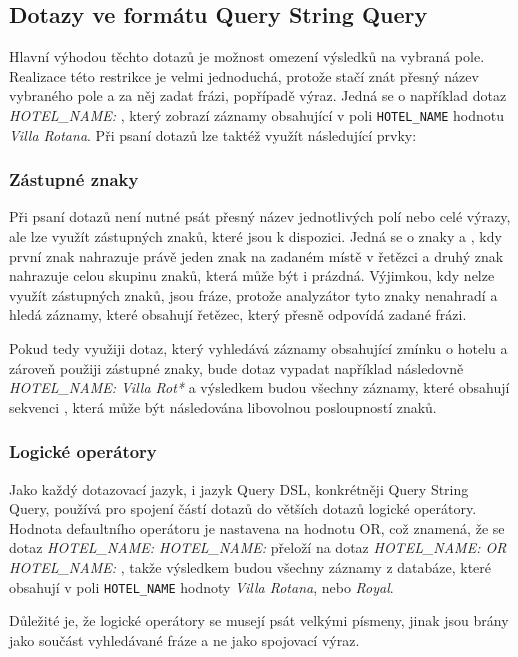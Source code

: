\documentclass[czech,BP]{thesiskiv}
\begin{document}
\subsection{Dotazy ve formátu Query String Query}
Hlavní výhodou těchto dotazů je možnost omezení výsledků na vybraná pole. Realizace této restrikce je velmi jednoduchá, protože stačí znát přesný název vybraného pole a za něj zadat frázi, popřípadě výraz. Jedná se o například dotaz \textit{HOTEL\_NAME: }, který zobrazí záznamy obsahující v poli \texttt{HOTEL\_NAME} hodnotu \textit{Villa Rotana}. Při psaní dotazů lze taktéž využít následující prvky:

\subsubsection{Zástupné znaky}
Při psaní dotazů není nutné psát přesný název jednotlivých polí nebo celé výrazy, ale lze využít zástupných znaků, které jsou k dispozici. Jedná se o znaky  a \uv{*}, kdy první znak nahrazuje právě jeden znak na zadaném místě v řetězci a druhý znak nahrazuje celou skupinu znaků, která může být i prázdná. Výjimkou, kdy nelze využít zástupných znaků, jsou fráze, protože analyzátor tyto znaky nenahradí a hledá záznamy, které obsahují řetězec, který přesně odpovídá zadané frázi.


Pokud tedy využiji dotaz, který vyhledává záznamy obsahující zmínku o hotelu  a zároveň použiji zástupné znaky, bude dotaz vypadat například následovně \textit{HOTEL\_NAME: Villa Rot*} a výsledkem budou všechny záznamy, které obsahují sekvenci , která může být následována libovolnou posloupností znaků.

\subsubsection{Logické operátory}
Jako každý dotazovací jazyk, i jazyk Query DSL, konkrétněji Query String Query, používá pro spojení částí dotazů do větších dotazů logické operátory. Hodnota defaultního operátoru je nastavena na hodnotu OR, což znamená, že se dotaz\textit{ HOTEL\_NAME:  HOTEL\_NAME:  } přeloží na dotaz \textit{HOTEL\_NAME:  OR HOTEL\_NAME:  }, takže výsledkem budou všechny záznamy z databáze, které obsahují v poli \texttt{HOTEL\_NAME} hodnoty \textit{Villa Rotana}, nebo \textit{Royal}.


Důležité je, že logické operátory se musejí psát velkými písmeny, jinak jsou brány jako součást vyhledávané fráze a ne jako spojovací výraz.
\end{document}
